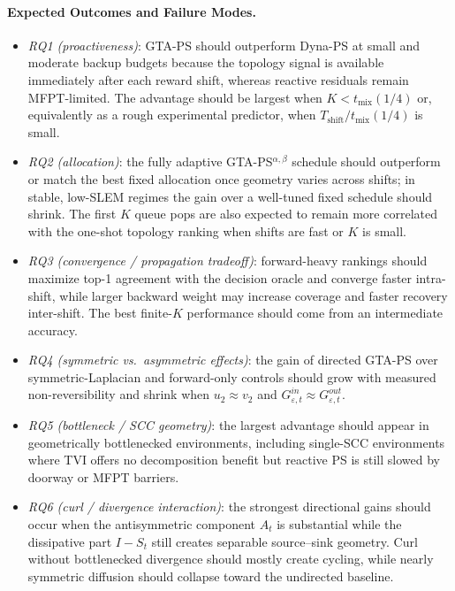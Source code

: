 \documentclass[10pt,a4paper]{article}
\begin{document}
\paragraph{Expected Outcomes and Failure Modes.}
\begin{itemize}\setlength\itemsep{2pt}
  \item \textit{RQ1 (proactiveness)}: GTA-PS should outperform Dyna-PS at small and moderate
    backup budgets because the topology signal is available immediately after each reward shift,
    whereas reactive residuals remain MFPT-limited.  The advantage should be largest when
    $K < t_{\mathrm{mix}}(1/4)$ or, equivalently as a rough experimental predictor, when
    $T_{\mathrm{shift}}/t_{\mathrm{mix}}(1/4)$ is small.

  \item \textit{RQ2 (allocation)}: the fully adaptive GTA-PS$^{\alpha,\beta}$ schedule should
    outperform or match the best fixed allocation once geometry varies across shifts; in stable,
    low-SLEM regimes the gain over a well-tuned fixed schedule should shrink.
    The first $K$ queue pops are also expected to remain more correlated with the one-shot
    topology ranking when shifts are fast or $K$ is small.

  \item \textit{RQ3 (convergence / propagation tradeoff)}: forward-heavy rankings should maximize
    top-1 agreement with the decision oracle and converge faster intra-shift,
    while larger backward weight may increase coverage and faster recovery inter-shift.
    The best finite-$K$ performance should come from an intermediate accuracy.

  \item \textit{RQ4 (symmetric vs.\ asymmetric effects)}: the gain of directed GTA-PS over
    symmetric-Laplacian and forward-only controls should grow with measured non-reversibility and
    shrink when $u_2 \approx v_2$ and $G^{in}_{\varepsilon,t} \approx G^{out}_{\varepsilon,t}$.

  \item \textit{RQ5 (bottleneck / SCC geometry)}: the largest advantage should appear in
    geometrically bottlenecked environments, including single-SCC environments where TVI offers no
    decomposition benefit but reactive PS is still slowed by doorway or MFPT barriers.

  \item \textit{RQ6 (curl / divergence interaction)}: the strongest directional gains should occur
    when the antisymmetric component $A_t$ is substantial while the dissipative part $I-S_t$
    still creates separable source--sink geometry. Curl without bottlenecked divergence should
    mostly create cycling, while nearly symmetric diffusion should collapse toward the undirected
    baseline.


\end{itemize}
\end{document}
